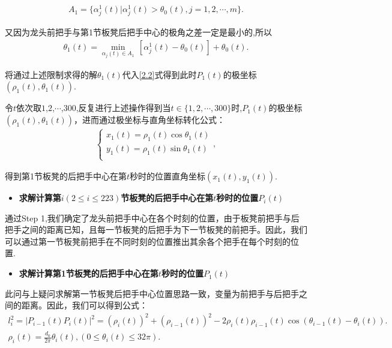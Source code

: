 \documentclass{cumcmthesis}
\begin{document}
\begin{align}\label{1.........5}
A_1 = \{ \alpha _{j}^{1}(t) |\alpha _{j}^{1}(t) >\theta _0(t),j = 1,2,\cdots ,m \} .
\end{align}
\par 又因为龙头前把手与第1节板凳后把手中心的极角之差一定是最小的,所以
\begin{align}\label{1.........6}
\theta _1(t)=\underset{\alpha _j(t)\in A_1}{\min}\,\left[ \alpha _{j}^{1}(t)-\theta _0\left( t \right) \right] +\theta _0\left( t \right) .
\end{align}
\par 将通过上述限制求得的解\(\theta _1(t)\)代入\eqref{2.2}式得到此时\(P_1(t)\)的极坐标\((\rho _1(t),\theta _1(t))\).
\par 令\(t\)依次取\(1\),\(2\),\(\cdots\),\(300\),反复进行上述操作得到当\(t\in \{ 1,2,\cdots ,300 \}\)时,\(P_1(t)\)的极坐标\((\rho _1(t),\theta _1(t))\)，进而通过极坐标与直角坐标转化公式：
\begin{align}
\begin{cases}
x_1(t)=\rho _1(t)\cos \theta _1(t)\\
y_1(t)=\rho _1(t)\sin \theta _1(t)\\
\end{cases}, \label{1.........7}   
\end{align}
\par 得到第1节板凳的后把手中心在第\(t\)秒时的位置直角坐标\((x_1(t),y_1(t))\).
\begin{itemize}
    \item \textbf{求解计算第\(i(2\leqslant i\leqslant 223)\)节板凳的后把手中心在第\(t\)秒时的位置\(P_{i}(t)\)}
    \end{itemize} 
    \par 通过Step 1,我们确定了龙头前把手中心在各个时刻的位置，由于板凳前把手与后把手之间的距离已知，且每一节板凳的后把手为下一节板凳的前把手。因此，我们可以通过第一节板凳前把手在不同时刻的位置推出其余各个把手在每个时刻的位置.
    \begin{itemize}
    \item \textbf{求解计算第1节板凳的后把手中心在第\(t\)秒时的位置\(P_1(t)\)}
    \end{itemize}
\par 此问与上疑问求解第一节板凳后把手中心位置思路一致，变量为前把手与后把手之间的距离。因此，我们可以得到公式：
\begin{gather}
    l_{i}^{2}=| P_{i-1}(t)P_{i}(t)|^2=(\rho _{i}(t))^2+(\rho _{i-1}(t))^2 - 2\rho _{i}(t)\rho _{i-1}(t)\cos (\theta _{i-1}(t)-\theta _{i}(t)) .\label{2.2.1}
    \\
    \rho _{i}(t)=\frac{d_0}{2\pi}\theta _{i}(t),(0\leqslant \theta _{i}(t)\leqslant 32\pi) .\label{2.2.2}
    \end{gather}
\end{document}
